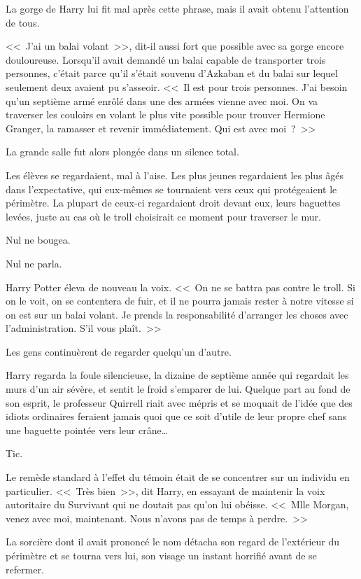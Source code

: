 La gorge de Harry lui fit mal après cette phrase, mais il avait obtenu l'attention de tous.

<<~J'ai un balai volant~>>, dit-il aussi fort que possible avec sa gorge encore douloureuse. Lorsqu'il avait demandé un balai capable de transporter trois personnes, c'était parce qu'il s'était souvenu d'Azkaban et du balai sur lequel seulement deux avaient pu s'asseoir. <<~Il est pour trois personnes. J'ai besoin qu'un septième armé enrôlé dans une des armées vienne avec moi. On va traverser les couloirs en volant le plus vite possible pour trouver Hermione Granger, la ramasser et revenir immédiatement. Qui est avec moi~?~>>

La grande salle fut alors plongée dans un silence total.

Les élèves se regardaient, mal à l'aise. Les plus jeunes regardaient les plus âgés dans l'expectative, qui eux-mêmes se tournaient vers ceux qui protégeaient le périmètre. La plupart de ceux-ci regardaient droit devant eux, leurs baguettes levées, juste au cas où le troll choisirait ce moment pour traverser le mur.

Nul ne bougea.

Nul ne parla.

Harry Potter éleva de nouveau la voix. <<~On ne se battra pas contre le troll. Si on le voit, on se contentera de fuir, et il ne pourra jamais rester à notre vitesse si on est sur un balai volant. Je prends la responsabilité d'arranger les choses avec l'administration. S'il vous plaît.~>>

Les gens continuèrent de regarder quelqu'un d'autre.

Harry regarda la foule silencieuse, la dizaine de septième année qui regardait les murs d'un air sévère, et sentit le froid s'emparer de lui. Quelque part au fond de son esprit, le professeur Quirrell riait avec mépris et se moquait de l'idée que des idiots ordinaires feraient jamais quoi que ce soit d'utile de leur propre chef sans une baguette pointée vers leur crâne…

Tic.

Le remède standard à l'effet du témoin était de se concentrer sur un individu en particulier. <<~Très bien~>>, dit Harry, en essayant de maintenir la voix autoritaire du Survivant qui ne doutait pas qu'on lui obéisse. <<~Mlle Morgan, venez avec moi, maintenant. Nous n'avons pas de temps à perdre.~>>

La sorcière dont il avait prononcé le nom détacha son regard de l'extérieur du périmètre et se tourna vers lui, son visage un instant horrifié avant de se refermer.

